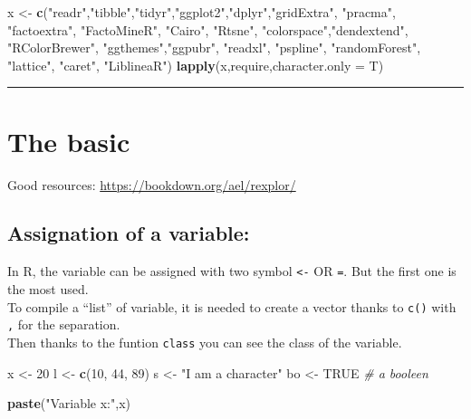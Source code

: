 \documentclass[
]{article}
\newenvironment{Shaded}{\begin{snugshade}}{\end{snugshade}}
\newcommand{\AttributeTok}[1]{\textcolor[rgb]{0.13,0.29,0.53}{#1}}
\newcommand{\CommentTok}[1]{\textcolor[rgb]{0.56,0.35,0.01}{\textit{#1}}}
\newcommand{\ConstantTok}[1]{\textcolor[rgb]{0.56,0.35,0.01}{#1}}
\newcommand{\DecValTok}[1]{\textcolor[rgb]{0.00,0.00,0.81}{#1}}
\newcommand{\FunctionTok}[1]{\textcolor[rgb]{0.13,0.29,0.53}{\textbf{#1}}}
\newcommand{\NormalTok}[1]{#1}
\newcommand{\OtherTok}[1]{\textcolor[rgb]{0.56,0.35,0.01}{#1}}
\newcommand{\StringTok}[1]{\textcolor[rgb]{0.31,0.60,0.02}{#1}}
\begin{document}
\begin{Shaded}
\begin{Highlighting}[]
\NormalTok{x }\OtherTok{\textless{}{-}} \FunctionTok{c}\NormalTok{(}\StringTok{"readr"}\NormalTok{,}\StringTok{"tibble"}\NormalTok{,}\StringTok{"tidyr"}\NormalTok{,}\StringTok{"ggplot2"}\NormalTok{,}\StringTok{"dplyr"}\NormalTok{,}\StringTok{"gridExtra"}\NormalTok{, }\StringTok{"pracma"}\NormalTok{, }\StringTok{"factoextra"}\NormalTok{, }\StringTok{"FactoMineR"}\NormalTok{, }\StringTok{"Cairo"}\NormalTok{, }\StringTok{"Rtsne"}\NormalTok{, }
       \StringTok{"colorspace"}\NormalTok{,}\StringTok{"dendextend"}\NormalTok{, }\StringTok{"RColorBrewer"}\NormalTok{, }\StringTok{"ggthemes"}\NormalTok{,}\StringTok{"ggpubr"}\NormalTok{, }\StringTok{"readxl"}\NormalTok{, }\StringTok{"pspline"}\NormalTok{, }\StringTok{"randomForest"}\NormalTok{, }\StringTok{"lattice"}\NormalTok{,}
       \StringTok{"caret"}\NormalTok{, }\StringTok{"LiblineaR"}\NormalTok{)}
\FunctionTok{lapply}\NormalTok{(x,require,}\AttributeTok{character.only =}\NormalTok{ T)}
\end{Highlighting}
\end{Shaded}

\begin{center}\rule{0.5\linewidth}{0.5pt}\end{center}

\hypertarget{the-basic}{%
\section{The basic}\label{the-basic}}

Good resources: \url{https://bookdown.org/ael/rexplor/}

\hypertarget{assignation-of-a-variable}{%
\subsection{Assignation of a
variable:}\label{assignation-of-a-variable}}

In R, the variable can be assigned with two symbol \texttt{\textless{}-}
OR \texttt{=}. But the first one is the most used.\\
To compile a ``list'' of variable, it is needed to create a vector
thanks to \texttt{c()} with \texttt{,} for the separation.\\
Then thanks to the funtion \texttt{class} you can see the class of the
variable.

\begin{Shaded}
\begin{Highlighting}[]
\NormalTok{x }\OtherTok{\textless{}{-}} \DecValTok{20}
\NormalTok{l }\OtherTok{\textless{}{-}} \FunctionTok{c}\NormalTok{(}\DecValTok{10}\NormalTok{, }\DecValTok{44}\NormalTok{, }\DecValTok{89}\NormalTok{)}
\NormalTok{s }\OtherTok{\textless{}{-}} \StringTok{"I am a character"}
\NormalTok{bo }\OtherTok{\textless{}{-}} \ConstantTok{TRUE} \CommentTok{\# a booleen}

\FunctionTok{paste}\NormalTok{(}\StringTok{"Variable x:"}\NormalTok{,x)}
\end{Highlighting}
\end{Shaded}
\end{document}
